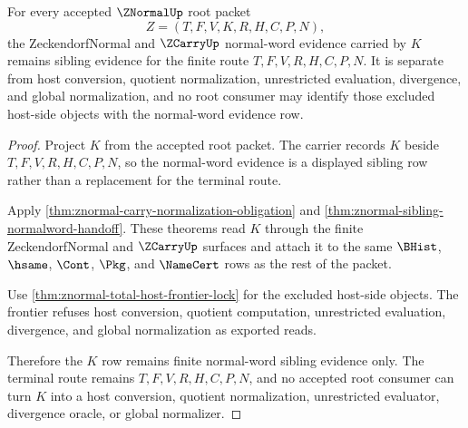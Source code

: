 \begin{theorem}
\label{thm:znormal-normal-word-sibling-separation}
For every accepted $\ZNormalUp$ root packet
$$
Z=(T,F,V,K,R,H,C,P,N),
$$
the ZeckendorfNormal and $\ZCarryUp$ normal-word evidence carried by $K$ remains sibling evidence for the finite route $T,F,V,R,H,C,P,N$. It is separate from host conversion, quotient normalization, unrestricted evaluation, divergence, and global normalization, and no root consumer may identify those excluded host-side objects with the normal-word evidence row.
\end{theorem}
\begin{proof}
Project $K$ from the accepted root packet. The carrier records $K$ beside $T,F,V,R,H,C,P,N$, so the normal-word evidence is a displayed sibling row rather than a replacement for the terminal route.

Apply \autoref{thm:znormal-carry-normalization-obligation} and \autoref{thm:znormal-sibling-normalword-handoff}. These theorems read $K$ through the finite ZeckendorfNormal and $\ZCarryUp$ surfaces and attach it to the same $\BHist$, $\hsame$, $\Cont$, $\Pkg$, and $\NameCert$ rows as the rest of the packet.

Use \autoref{thm:znormal-total-host-frontier-lock} for the excluded host-side objects. The frontier refuses host conversion, quotient computation, unrestricted evaluation, divergence, and global normalization as exported reads.

Therefore the $K$ row remains finite normal-word sibling evidence only. The terminal route remains $T,F,V,R,H,C,P,N$, and no accepted root consumer can turn $K$ into a host conversion, quotient normalization, unrestricted evaluator, divergence oracle, or global normalizer.
\end{proof}
